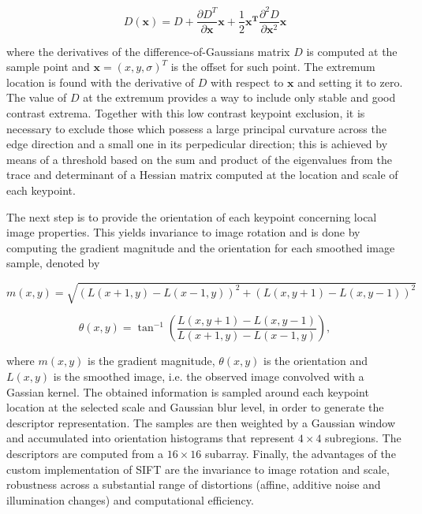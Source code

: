 \begin{equation}
\label{eqn:taylor_DoG}
D(\mathbf{x}) = D + 
                \frac{\partial D^{T}}{\partial  \mathbf{x}}\mathbf{x} + \frac{1}{2}\mathbf{x^{T}}\frac{\partial^{2} D}{\partial \mathbf{x}^{2}}\mathbf{x}
\end{equation}

\noindent where the derivatives of the difference-of-Gaussians matrix $D$ is computed at the sample point and $\mathbf{x} = (x,y,\sigma)^{T}$ is the offset for such point. The extremum location is found with the derivative of $D$ with respect to $\mathbf{x}$ and setting it to zero. The value of $D$ at the extremum provides a way to include only stable and good contrast extrema. Together with this low contrast keypoint exclusion, it is necessary to exclude those which possess a large principal curvature across the edge direction and a small one in its perpedicular direction; this is achieved by means of a threshold based on the sum and product of the eigenvalues from the trace and determinant of a Hessian matrix computed at the location and scale of each keypoint.

The next step is to provide the orientation of each keypoint concerning local image properties. This yields invariance to image rotation and is done by computing the gradient magnitude and the orientation for each smoothed image sample, denoted by

\begin{equation}
m(x,y) = \sqrt{(L(x + 1, y) - L(x - 1, y))^{2} + (L(x, y + 1) - L(x, y - 1))^{2}}
\end{equation}

\begin{equation}
\theta(x,y) = \tan^{-1}
			\left(
			\frac{L(x, y + 1) - L(x, y - 1)}
				 {L(x + 1, y) - L(x - 1, y)}
			\right),
\end{equation}

\noindent where $m(x,y)$ is the gradient magnitude, $\theta(x,y)$ is the orientation and $L(x,y)$ is the smoothed image, i.e. the observed image convolved with a Gassian kernel. The obtained information is sampled around each keypoint location at the selected scale and Gaussian blur level, in order to generate the descriptor representation. The samples are then weighted by a Gaussian window and accumulated into orientation histograms that represent $4 \times 4$ subregions. The descriptors are computed from a $16 \times 16$ subarray. Finally, the advantages of the custom implementation of SIFT are the invariance to image rotation and scale, robustness across a substantial range of distortions (affine, additive noise and illumination changes) and computational efficiency.


